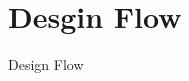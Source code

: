 \section{Desgin Flow}
\begin{frame}{Design Flow}
  \vspace{-0.3cm}
  \begin{figure}
    \centering
    \def\svgwidth{0.88\textwidth}
    
  \end{figure}
\end{frame}